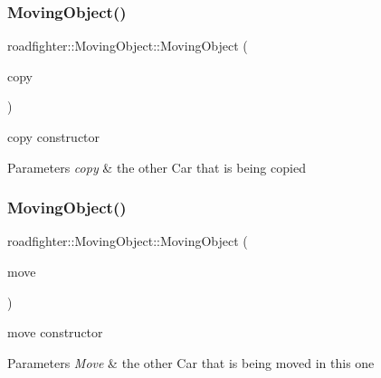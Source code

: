 \subsubsection{\texorpdfstring{Moving\+Object()}{MovingObject()}\hspace{0.1cm}{\footnotesize\ttfamily [2/3]}}
{\footnotesize\ttfamily roadfighter\+::\+Moving\+Object\+::\+Moving\+Object (\begin{DoxyParamCaption}\item[{const \hyperlink{classroadfighter_1_1MovingObject}{Moving\+Object} \&}]{copy }\end{DoxyParamCaption})\hspace{0.3cm}{\ttfamily [default]}}

copy constructor 
\begin{DoxyParams}{Parameters}
{\em copy} & the other Car that is being copied \\
\hline
\end{DoxyParams}
\mbox{\label{classroadfighter_1_1MovingObject_a759ad597bca6a44c49adf7082fe44469}} 
\subsubsection{\texorpdfstring{Moving\+Object()}{MovingObject()}\hspace{0.1cm}{\footnotesize\ttfamily [3/3]}}
{\footnotesize\ttfamily roadfighter\+::\+Moving\+Object\+::\+Moving\+Object (\begin{DoxyParamCaption}\item[{\hyperlink{classroadfighter_1_1MovingObject}{Moving\+Object} \&\&}]{move }\end{DoxyParamCaption})\hspace{0.3cm}{\ttfamily [default]}}

move constructor 
\begin{DoxyParams}{Parameters}
{\em Move} & the other Car that is being moved in this one \\
\hline
\end{DoxyParams}
\mbox{\label{classroadfighter_1_1MovingObject_aabb801baf353d53a36998983abbb803a}} 
